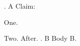 
\document
{}. A\endhead
{} Claim:
\roster
\item One.
\item Two.
\endproclaim
After.
. B\endhead
Body B.
\enddocument

